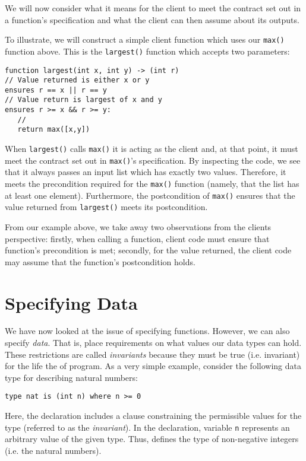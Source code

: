 We will now consider what it means for the client to meet the contract set out in a function's specification and what the client can then assume about its outputs. 

\begin{eg}
To illustrate, we will construct a simple client function which uses our \lstinline{max()} function above.  This is the \lstinline{largest()} function which accepts two parameters:
\begin{lstlisting}
function largest(int x, int y) -> (int r)
// Value returned is either x or y
ensures r == x || r == y
// Value return is largest of x and y
ensures r >= x && r >= y:
   //
   return max([x,y])
\end{lstlisting}
When \lstinline{largest()} calls \lstinline{max()} it is acting as the client and, at that point, it must meet the contract set out in \lstinline{max()}'s specification.  By inspecting the code, we see that it always passes an input list which has exactly two values.  Therefore, it meets the precondition required for the \lstinline{max()} function (namely, that the list has at least one element).  Furthermore, the postcondition of \lstinline{max()} ensures that the value returned from \lstinline{largest()} meets its postcondition.
\end{eg}

From our example above, we take away two observations from the clients perspective:  firstly, when calling a function, client code must ensure that function's precondition is met; secondly, for the value returned, the client code may assume that the function's postcondition holds.

\section{Specifying Data}

We have now looked at the issue of specifying functions.  However, we can also specify {\em data}.  That is, place requirements on what values our data types can hold.  These restrictions are called {\em invariants} because they must be true (i.e. invariant) for the life the of program.  As a very simple example, consider the following data type for describing natural numbers:

\begin{lstlisting}
type nat is (int n) where n >= 0
\end{lstlisting}

Here, the  declaration includes a  clause constraining the permissible values for the type (referred to as the {\em invariant}).  In the declaration, variable \lstinline{n} represents an arbitrary value of the given type.  Thus,  defines the type of non-negative integers (i.e. the natural numbers).

